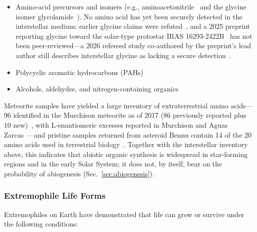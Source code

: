 \documentclass[aps,prd,twocolumn,superscriptaddress,nofootinbib]{revtex4-2}
\begin{document}
\begin{itemize}
  \item Amino-acid precursors and isomers (e.g., aminoacetonitrile~\cite{McGuire2022} and the glycine isomer glycolamide~\cite{Rivilla2023}). No amino acid has yet been securely detected in the interstellar medium: earlier glycine claims were refuted~\cite{McGuire2022}, and a 2025 preprint reporting glycine toward the solar-type protostar IRAS 16293-2422B~\cite{Quan2025} has not been peer-reviewed---a 2026 refereed study co-authored by the preprint's lead author still describes interstellar glycine as lacking a secure detection~\cite{Duan2026}.
  \item Polycyclic aromatic hydrocarbons (PAHs)
  \item Alcohols, aldehydes, and nitrogen-containing organics
\end{itemize}

Meteorite samples have yielded a large inventory of extraterrestrial amino acids---96 identified in the Murchison meteorite as of 2017 (86 previously reported plus 10 new)~\cite{Koga2017}, with L-enantiomeric excesses reported in Murchison and Aguas Zarcas~\cite{Glavin2021}---and pristine samples returned from asteroid Bennu contain 14 of the 20 amino acids used in terrestrial biology~\cite{Glavin2025}. Together with the interstellar inventory above, this indicates that abiotic organic synthesis is widespread in star-forming regions and in the early Solar System; it does not, by itself, bear on the probability of abiogenesis (Sec.~\ref{sec:abiogenesis}).

\subsubsection{Extremophile Life Forms}\label{sec:extremophiles}

Extremophiles on Earth have demonstrated that life can grow or survive under the following conditions:
\end{document}
